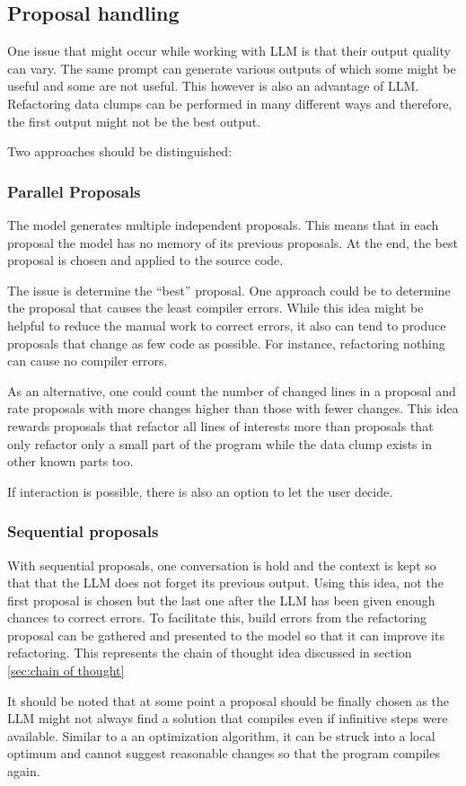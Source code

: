


\subsection{Proposal handling}

One issue that might occur while working with \ac{LLM} is that their output quality can vary. The same prompt can generate various outputs of which some might be useful and some are not useful. This however is also an advantage of \acs{LLM}. Refactoring data clumps can be performed in many different ways and therefore, the first output might not be the best output. 

Two approaches should be distinguished:
\subsubsection{Parallel Proposals}
The model generates multiple independent proposals. This means that in each proposal the model has no memory of its previous proposals. At the end, the best proposal is chosen and applied to the source code.

The issue is determine the \enquote{best} proposal. One approach could be to determine the proposal that causes the least compiler errors. While this idea might be helpful to reduce the manual work to correct errors, it also can tend to produce proposals that change as few code as possible. For instance, refactoring nothing can cause no compiler errors.

As an alternative, one could count the number of changed lines in a proposal and rate proposals with more changes higher than those with fewer changes. This idea rewards proposals that refactor all lines of interests more than proposals that only refactor only a small part of the program while the data clump exists in other known parts too. 


If interaction is possible, there is also an option to let the user decide.
\subsubsection{Sequential proposals}

With sequential proposals, one conversation is hold and the context is kept so that that the \ac{LLM} does not forget its previous output. Using this idea, not the first proposal is chosen but the last one after the \ac{LLM} has been given enough chances to correct errors.  To facilitate this, build errors from the refactoring proposal can be gathered and presented to the model so that it can improve its refactoring. This represents the chain of thought idea discussed in section \ref{sec:chain of thought}

It should be noted that at some point a proposal should be finally chosen as the \ac{LLM} might not always find a solution that compiles even if infinitive steps were available. Similar to a an optimization algorithm, it can be struck into a local optimum and cannot suggest reasonable changes so that the program compiles again.  